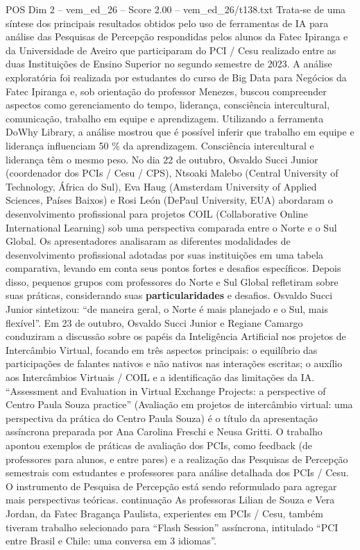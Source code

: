 \begin{textsample}{POS Dim 2 – vem\_ed\_26 – Score 2.00 – vem\_ed\_26/t138.txt}
Trata-se de uma síntese dos principais resultados obtidos pelo uso de ferramentas de IA para análise das Pesquisas de Percepção respondidas pelos alunos da Fatec Ipiranga e da Universidade de Aveiro que participaram do PCI / Cesu realizado entre as duas Instituições de Ensino Superior no segundo semestre de 2023.
A análise exploratória foi realizada por estudantes do curso de Big Data para Negócios da Fatec Ipiranga e, sob orientação do professor Menezes, buscou compreender aspectos como gerenciamento do tempo, liderança, consciência intercultural, comunicação, trabalho em equipe e aprendizagem.
Utilizando a ferramenta DoWhy Library, a análise mostrou que é possível inferir que trabalho em equipe e liderança influenciam 50 \% da aprendizagem.
Consciência intercultural e liderança têm o mesmo peso.
No dia 22 de outubro, Osvaldo Succi Junior (coordenador dos PCIs / Cesu / CPS), Ntsoaki Malebo (Central University of Technology, África do Sul), Eva Haug (Amsterdam University of Applied Sciences, Países Baixos) e Rosi León (DePaul University, EUA) abordaram o desenvolvimento profissional para projetos COIL (Collaborative Online International Learning) sob uma perspectiva comparada entre o Norte e o Sul Global.
Os apresentadores analisaram as diferentes modalidades de desenvolvimento profissional adotadas por suas instituições em uma tabela comparativa, levando em conta seus pontos fortes e desafios específicos.
Depois disso, pequenos grupos com professores do Norte e Sul Global refletiram sobre suas práticas, considerando suas \textbf{particularidades} e desafios.
Osvaldo Succi Junior sintetizou: “de maneira geral, o Norte é mais planejado e o Sul, mais flexível”.
Em 23 de outubro, Osvaldo Succi Junior e Regiane Camargo conduziram a discussão sobre os papéis da Inteligência Artificial nos projetos de Intercâmbio Virtual, focando em três aspectos principais: o equilíbrio das participações de falantes nativos e não nativos nas interações escritas; o auxílio aos Intercâmbios Virtuais / COIL e a identificação das limitações da IA. “Assessment and Evaluation in Virtual Exchange Projects: a perspective of Centro Paula Souza practice” (Avaliação em projetos de intercâmbio virtual: uma perspectiva da prática do Centro Paula Souza) é o título da apresentação assíncrona preparada por Ana Carolina Freschi e Neusa Gritti.
O trabalho apontou exemplos de práticas de avaliação dos PCIs, como feedback (de professores para alunos, e entre pares) e a realização das Pesquisas de Percepção semestrais com estudantes e professores para análise detalhada dos PCIs / Cesu.
O instrumento de Pesquisa de Percepção está sendo reformulado para agregar mais perspectivas teóricas. continuação As professoras Lilian de Souza e Vera Jordan, da Fatec Bragança Paulista, experientes em PCIs / Cesu, também tiveram trabalho selecionado para “Flash Session” assíncrona, intitulado “PCI entre Brasil e Chile: uma conversa em 3 idiomas”.

\end{textsample}
